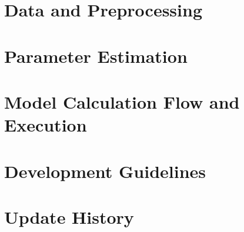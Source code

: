 \documentclass[11pt,a4paper,headings=small,parskip=half]{scrartcl}
\numberwithin{equation}{section}
\begin{document}
\section{Data and Preprocessing}\label{sec:data}


\section{Parameter Estimation}\label{sec:param}


\section[Model Calculation Flow and Execution]{\huge Model Calculation Flow and Execution}\label{sec:calc}


\section{Development Guidelines}\label{sec:development}


\section{Update History}


\printbibliography[
  title={References},
  heading=bibintoc
]

\appendix

\setcounter{figure}{0}
\renewcommand{\thefigure}{A\arabic{figure}}

\label{sec:appendix_a}


\setcounter{figure}{0}
\renewcommand{\thefigure}{B\arabic{figure}}

\label{sec:appendix_b}


\setcounter{table}{0}
\renewcommand{\thetable}{C\arabic{table}}

\label{sec:appendix_c}

\end{document}
